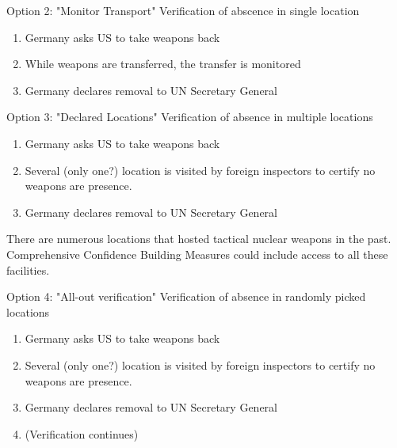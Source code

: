 \documentclass[presentation]{beamer}
\begin{document}
\begin{frame}[label={sec:orga02e9fc}]{Option 2: "Monitor Transport"}
\Large Verification of abscence in single location

\normalsize

\begin{enumerate}
\item Germany asks US to take weapons back
\item While weapons are transferred, the transfer is monitored
\item Germany declares removal to UN Secretary General
\end{enumerate}
\end{frame}

\begin{frame}[label={sec:org3195cc4}]{Option 3: "Declared Locations"}
\Large Verification of absence in multiple locations

\normalsize

\begin{enumerate}
\item Germany asks US to take weapons back
\item Several (only one?) location is visited by foreign inspectors to certify no weapons are presence.
\item Germany declares removal to UN Secretary General
\end{enumerate}

There are numerous locations that hosted tactical nuclear weapons in the past. Comprehensive Confidence Building Measures could include access to all these facilities.

\end{frame}

\begin{frame}[label={sec:org31c0010}]{Option 4: "All-out verification"}
\Large Verification of absence in randomly picked locations

\normalsize

\begin{enumerate}
\item Germany asks US to take weapons back
\item Several (only one?) location is visited by foreign inspectors to certify no weapons are presence.
\item Germany declares removal to UN Secretary General
\item (Verification continues)
\end{enumerate}
\end{frame}
\end{document}
